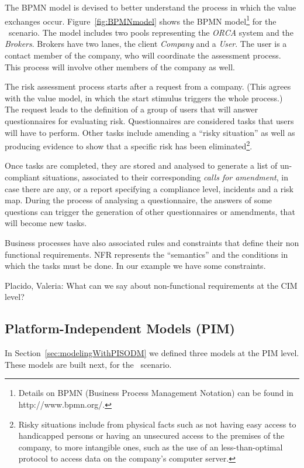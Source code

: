 The BPMN model is devised to better understand the process in which the value exchanges occur.
Figure~\ref{fig:BPMNmodel} shows the BPMN model\footnote{Details on BPMN (Business Process Management Notation) can be found in http://www.bpmn.org/.} for the \FlyingPig\ scenario. 
The model includes two pools representing the \textsl{ORCA} system and the \textsl{Brokers}. 
Brokers have two lanes, the client \textsl{Company} and a \textsl{User}. 
The user is a contact member of the company, who will coordinate the assessment process. 
This process will involve other members of the company as well.

The risk assessment process starts after a request from a company.
(This agrees with the value model, in which the start stimulus triggers the whole process.)
The request leads to the definition of a group of users that will answer questionnaires for evaluating risk.
Questionnaires are considered tasks that users will have to perform. 
Other tasks include amending a ``risky situation'' as well as producing evidence to show that a specific risk has been eliminated\footnote{Risky situations include from physical facts such as not having easy access to handicapped persons or having an unsecured access to the premises of the company, to more intangible ones, such as the use of an less-than-optimal protocol to access data on the company's computer server.}.

Once tasks are completed, they are stored and analysed to generate a list of un-compliant situations, associated to their corresponding \textit{calls for amendment}, in case there are any, or a report specifying a compliance level, incidents and a risk map.
During the process of analysing a questionnaire, the answers of some questions can trigger the generation of other questionnaires or amendments, that will become new tasks.  

Business processes have also associated rules and constraints that define their non functional requirements.
NFR represents the ``semantics'' and the conditions in which the tasks must be done.
In our example we have some constraints.

{\color{red}
Placido, Valeria: What can we say about non-functional requirements at the CIM level?
}

\subsection{Platform-Independent Models (PIM)}

In Section~\ref{sec:modelingWithPISODM} we defined three models at the PIM level.
These models are built next, for the \FlyingPig\ scenario.

